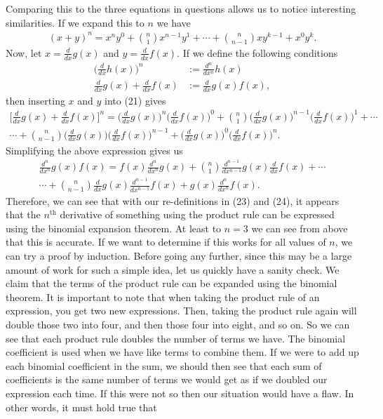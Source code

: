 Comparing this to the three equations in questions allows us to notice interesting similarities. If we expand this to $n$ we have
\begin{align}
	(x+y)^n=x^ny^0+{{n}\choose{1}}x^{n-1}y^1+\cdots+{{n}\choose{n-1}}xy^{k-1}+x^0y^k.
\end{align}
Now, let $x=\frac{d}{dx}g(x)$ and $y=\frac{d}{dx}f(x)$. If we define the following conditions
\begin{align}
	\bigg(\frac{d}{dx}h(x)\bigg)^n&:=\frac{d^n}{dx^n}h(x) \\
	\frac{d}{dx}g(x)+\frac{d}{dx}f(x) &:= \frac{d}{dx}g(x)f(x),
\end{align}
then inserting $x$ and $y$ into (21) gives
\begin{align}
	\bigg[\frac{d}{dx}g(x)+\frac{d}{dx}f(x) \bigg]^n=\bigg(\frac{d}{dx}g(x)\bigg)^n\bigg(\frac{d}{dx}f(x)\bigg)^0+{{n}\choose{1}}\bigg(\frac{d}{dx}g(x)\bigg)^{n-1}\bigg(\frac{d}{dx}f(x)\bigg)^1+\cdots \\ \cdots+{{n}\choose{n-1}}\bigg(\frac{d}{dx}g(x)\bigg)\bigg(\frac{d}{dx}f(x)\bigg)^{n-1}+\bigg(\frac{d}{dx}g(x)\bigg)^0\bigg(\frac{d}{dx}f(x)\bigg)^n.
\end{align}
Simplifying the above expression gives us
\begin{align}
	\frac{d^n}{dx^n}g(x)f(x)=f(x)\frac{d^n}{dx^n}g(x)+{{n}\choose{1}}\frac{d^{n-1}}{dx^{n-1}}g(x)\frac{d}{dx}f(x)+\cdots \\
	\cdots+{{n}\choose{n-1}}\frac{d}{dx}g(x)\frac{d^{n-1}}{dx^{n-1}}f(x)+g(x)\frac{d^n}{dx^n}f(x).
\end{align}
Therefore, we can see that with our re-definitions in (23) and (24), it appears that the $n^{\textrm{th}}$ derivative of something using the product rule can be expressed using the binomial expansion theorem. At least to $n=3$ we can see from above that this is accurate. If we want to determine if this works for all values of $n$, we can try a proof by induction. Before going any further, since this may be a large amount of work for such a simple idea, let us quickly have a sanity check. We claim that the terms of the product rule can be expanded using the binomial theorem. It is important to note that when taking the product rule of an expression, you get two new expressions. Then, taking the product rule again will double those two into four, and then those four into eight, and so on. So we can see that each product rule doubles the number of terms we have. The binomial coefficient is used when we have like terms to combine them. If we were to add up each binomial coefficient in the sum, we should then see that each sum of coefficients is the same number of terms we would get as if we doubled our expression each time. If this were not so then our situation would have a flaw. In other words, it must hold true that
